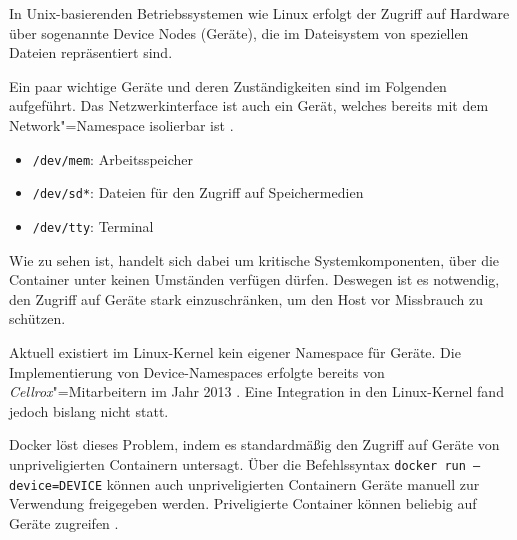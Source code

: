 \documentclass[../main.tex]{subfiles}
\begin{document}
			In Unix-basierenden Betriebssystemen wie Linux erfolgt der Zugriff auf Hardware über sogenannte Device Nodes (Geräte), die im Dateisystem von speziellen Dateien repräsentiert sind.

			Ein paar wichtige Geräte und deren Zuständigkeiten sind im Folgenden aufgeführt. Das Netzwerkinterface ist auch ein Gerät, welches bereits mit dem Network"=Namespace isolierbar ist \cite{deviceNs}.

			\begin{itemize}
				\item \texttt{/dev/mem}: Arbeitsspeicher
				\item \texttt{/dev/sd*}: Dateien für den Zugriff auf Speichermedien
				\item \texttt{/dev/tty}: Terminal
			\end{itemize}

			Wie zu sehen ist, handelt sich dabei um kritische Systemkomponenten, über die Container unter keinen Umständen verfügen dürfen. Deswegen ist es notwendig, den Zugriff auf Geräte stark einzuschränken, um den Host vor Missbrauch zu schützen.

			Aktuell existiert im Linux-Kernel kein eigener Namespace für Geräte. Die Implementierung von Device-Namespaces erfolgte bereits von \emph{Cellrox}"=Mitarbeitern im Jahr 2013 \cite{deviceNsCerrox}. Eine Integration in den Linux-Kernel fand jedoch bislang nicht statt.

			Docker löst dieses Problem, indem es standardmäßig den Zugriff auf Geräte von unpriveligierten Containern untersagt. Über die Befehlssyntax \texttt{docker run --device=DEVICE} können auch unpriveligierten Containern Geräte manuell zur Verwendung freigegeben werden. Priveligierte Container können beliebig auf Geräte zugreifen \cite{dockerRun}.





\end{document}
